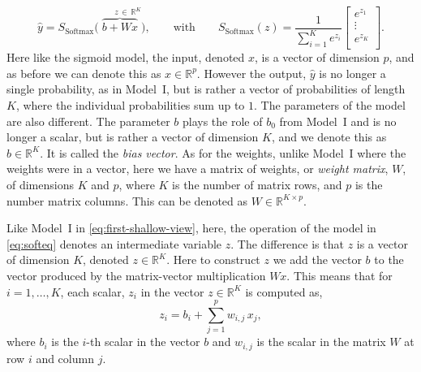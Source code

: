 \documentclass[12pt]{article}
\begin{document}
%
\begin{equation}
\label{eq:softeq}
\hat{y}=S_{\text{Softmax}} \big(\overbrace{b+W  x}^{\quad \,\,\, \, \,\, z\, \in \, {\mathbb R}^K}\big),
%
\qquad
\text{with}
\qquad
%
S_{\textrm{Softmax}}(z) = \frac{1}{\sum_{i=1}^{K} e^{z_i}} 
\begin{bmatrix}
e^{z_1} \\
\vdots\\
e^{z_{K}}\\
\end{bmatrix}.
\end{equation}
%
Here like the sigmoid model, the input, denoted $x$, is a vector of dimension $p$, and as before we can denote this as  $x\in {\mathbb R}^p$. However the output, $\hat{y}$ is no longer a single probability, as in Model~I, but is rather a vector of probabilities of length $K$, where the individual probabilities sum up to $1$. The parameters of the model are also different. The parameter $b$ plays the role of $b_0$ from Model~I and is no longer a scalar, but is rather a vector of dimension $K$, and we denote this as $b\in {\mathbb R}^K$. It is called the {\em bias vector}. As for the weights, unlike Model~I where the weights were in a vector, here we have a matrix of weights, or {\em weight matrix}, $W$, of dimensions $K$ and $p$, where $K$ is the number of matrix rows, and $p$ is the number matrix columns. This can be denoted as $W\in {\mathbb R}^{K\times p}$.

Like Model~I in \eqref{eq:first-shallow-view}, here, the operation of the model in \eqref{eq:softeq} denotes an intermediate variable $z$. The difference is that $z$ is a vector of dimension $K$, denoted $z \in {\mathbb R}^K$. Here to construct $z$ we add the vector $b$ to the vector produced by the matrix-vector multiplication $W x$. 
This means that for $i=1,\dots,K$, each scalar, $z_i$ in the vector $z\in {\mathbb R}^K$ is computed as,
%
\begin{equation}
\label{eq:small-zk-log-mult}
z_i = b_i + \sum_{j=1}^p w_{i,j} \, x_j,
\end{equation}
%
where $b_i$ is the $i$-th scalar in the vector $b$ and $w_{i,j}$ is the scalar in the matrix $W$ at row $i$ and column $j$.
\end{document}
